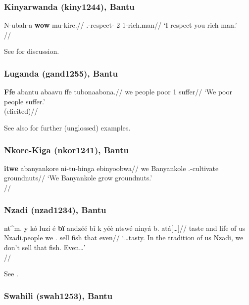 \documentclass[A4paper]{article}
\begin{document}
\subsubsection{Kinyarwanda (kiny1244), Bantu}


\ex \begingl
\gla N-ubah-a \textbf{wow} mu-kire.//
\Sg.\Subj-respect-\Fv{} 2\Sg{} \Ncl{}1-rich.man//
\glft `I respect you rich man.' \\\citep[69, (73a)]{vanderwal2022}//
\endgl
\xe

See \citet[67--69]{vanderwal2022} for discussion.

\subsubsection{Luganda (gand1255), Bantu}

\ex \begingl
\gla \textbf{Ffe} abantu abaavu ffe tubonaabona.//
\glb we people poor 1\Pl{} suffer//
\glft `We poor people suffer.'\\(elicited)//
\endgl
\xe 

See also \citet[102]{ashtonetal1954} for further (unglossed) examples.

\newpage

\subsubsection{Nkore-Kiga (nkor1241), Bantu}

\ex 
\begingl
\gla \textbf{itwe} abanyankore ni-tu-hinga ebinyoobwa//
\glb we Banyankole \Prs.\Pl-cultivate groundnuts//
\glft `We Banyankole grow groundnuts.'\\\citep[after][131, (368)]{taylor1985}//
\endgl
\xe 


\subsubsection{Nzadi (nzad1234), Bantu}


\ex \begingl
\gla nt\^{\textschwa}m. y\textepsilon{} kó luzí\ng{} \textdownstep{}é \textbf{b\"{i}} andzéé b\v{i} k yéè ntswé ninyá b\textopeno{}. atá{[\ldots]}//
\glb taste and \Loc{} life of us Nzadi.people we \Neg.\Prs{} sell fish that \Neg{} even//
\glft `\ldots tasty. In the tradition of us Nzadi, we don't sell that fish. Even\ldots' \\\citep[279, (10)]{craneetal2011}//
\endgl
\xe 

See \citet[210, 279]{craneetal2011}.

\subsubsection{Swahili (swah1253), Bantu}
\end{document}

